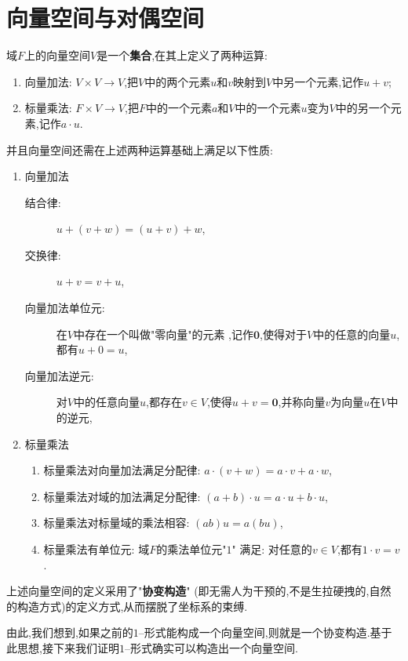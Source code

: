 \section{向量空间与对偶空间}
\begin{definition}
    域$F$上的向量空间$V$是一个{\color{magenta}\textbf{集合}},在其上定义了两种运算:
    \begin{enumerate}
        \item 向量加法: $V\times V\to V$,把$V$中的两个元素$u$和$v$映射到$V$中另一个元素,记作$u+v$;
        \item 标量乘法: $F\times V\to V$,把$F$中的一个元素$a$和$V$中的一个元素$u$变为$V$中的另一个元素,记作$a\cdot u$.
    \end{enumerate}
    并且向量空间还需在上述两种运算基础上满足以下性质:
    \begin{enumerate}
        \item 向量加法
        \begin{description}
            \item[结合律:] $u+(v+w)=(u+v)+w$,
            \item[交换律:] $u+v=v+u$,
            \item[向量加法单位元:] 在$V$中存在一个叫做"零向量"的元素 ,记作$\bm{0}$,使得对于$V$中的任意的向量$u$,都有$u+0=u$,
            \item[向量加法逆元:] 对$V$中的任意向量$u$,都存在$v\in V$,使得$u+v=\bm{0}$,并称向量$v$为向量$u$在$V$中的逆元,
        \end{description}
        \item 标量乘法
        \begin{enumerate}
            \item 标量乘法对向量加法满足分配律: $a\cdot (v+w)=a\cdot v+a\cdot w$,
            \item 标量乘法对域的加法满足分配律: $(a+b)\cdot u=a\cdot u+b\cdot u$,
            \item 标量乘法对标量域的乘法相容: $(ab)u=a(bu)$,
            \item 标量乘法有单位元: 域$F$的乘法单位元"$1$" 满足: 对任意的$v\in V$,都有$1\cdot v=v$.
        \end{enumerate}
    \end{enumerate}
\end{definition}
上述向量空间的定义采用了"\textbf{协变构造}" (即无需人为干预的,不是生拉硬拽的,自然的构造方式)的定义方式,从而摆脱了坐标系的束缚.

由此,我们想到,如果之前的$1$--形式能构成一个向量空间,则就是一个协变构造.基于此思想,接下来我们证明$1$--形式确实可以构造出一个向量空间.

